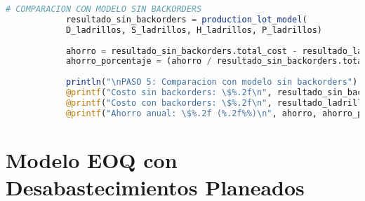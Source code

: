 \documentclass[12pt,a4paper]{book}
\begin{document}
\begin{tcolorbox}[enhanced,colback=azulclaro,colframe=azulprincipal,boxrule=2pt,arc=8pt,
		title={\bfseries\color{white} \faCode\ SOLUCI\'ON PASO A PASO},breakable]
\begin{lstlisting}[language=Julia,basicstyle=\footnotesize\ttfamily]
			# COMPARACION CON MODELO SIN BACKORDERS
			resultado_sin_backorders = production_lot_model(
			D_ladrillos, S_ladrillos, H_ladrillos, P_ladrillos)
			
			ahorro = resultado_sin_backorders.total_cost - resultado_ladrillos.total_cost
			ahorro_porcentaje = (ahorro / resultado_sin_backorders.total_cost) * 100
			
			println("\nPASO 5: Comparacion con modelo sin backorders")
			@printf("Costo sin backorders: \$%.2f\n", resultado_sin_backorders.total_cost)
			@printf("Costo con backorders: \$%.2f\n", resultado_ladrillos.total_cost)
			@printf("Ahorro anual: \$%.2f (%.2f%%)\n", ahorro, ahorro_porcentaje)
		\end{lstlisting}
		
	\end{tcolorbox}
	
	\section{Modelo EOQ con Desabastecimientos Planeados}
	
\end{document}
